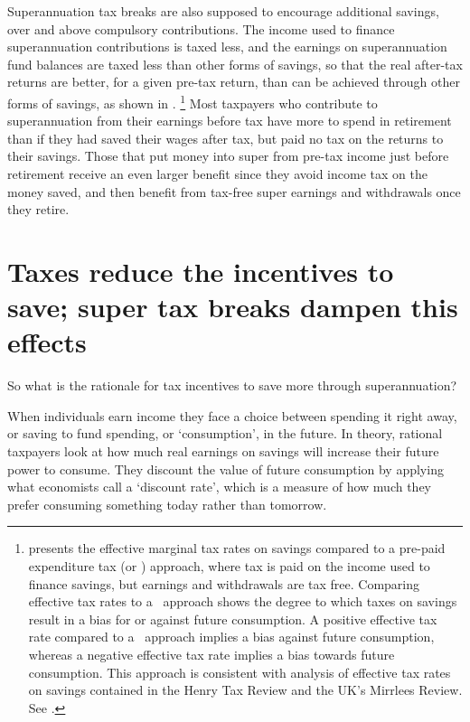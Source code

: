 \documentclass{grattanAlpha}
\begin{document}
Superannuation tax breaks are also supposed to encourage additional savings, over and above compulsory contributions. The income used to finance superannuation contributions is taxed less, and the earnings on superannuation fund balances are taxed less than other forms of savings, so that the real after-tax returns are better, for a given pre-tax return, than can be achieved through other forms of savings, as shown in .%
%
\footnote{%
 presents the effective marginal tax rates on savings compared to a pre-paid expenditure tax (or \TEE) approach, where tax is paid on the income used to finance savings, but earnings and withdrawals are tax free. Comparing effective tax rates to a \TEE\ approach shows the degree to which taxes on savings result in a bias for or against future consumption. A positive effective tax rate compared to a \TEE\ approach implies a bias against future consumption, whereas a negative effective tax rate implies a bias towards future consumption. This approach is consistent with analysis of effective tax rates on savings contained in the Henry Tax Review and the UK’s Mirrlees Review. 
See \textcites{HenryTaxReview2010}{Wakefield2009}[][322]{MirrleesAdamBesleyEtAl2011}.%
}
%  
Most taxpayers who contribute to superannuation from their earnings before tax have more to spend in retirement than if they had saved their wages after tax, but paid no tax on the returns to their savings. Those that put money into super from pre-tax income just before retirement receive an even larger benefit since they avoid income tax on the money saved, and then benefit from tax-free super earnings and withdrawals once they retire.

\section{Taxes reduce the incentives to save; super tax breaks dampen this effects}\label{sec:SUPER-2-5}
So what is the rationale for tax incentives to save more through superannuation?

When individuals earn income they face a choice between spending it right away, or saving to fund spending, or ‘consumption’, in the future. In theory, rational taxpayers look at how much real earnings on savings will increase their future power to consume. They discount the value of future consumption by applying what economists call a ‘discount rate’, which is a measure of how much they prefer consuming something today rather than tomorrow. 
\end{document}

